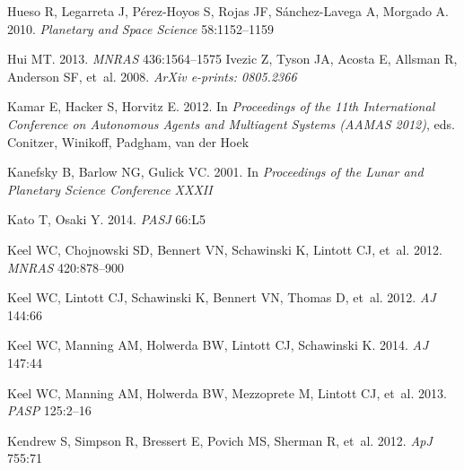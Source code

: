 \documentclass{ar2e}
\def\apj{ApJ}
\def\mnras{MNRAS}
\def\aj{AJ}
\def\pasp{PASP}
\def\pasj{PASJ}
\begin{document}
\begin{thebibliography}{}
{Hueso} R, {Legarreta} J, {P{\'e}rez-Hoyos} S, {Rojas} JF, {S{\'a}nchez-Lavega}
  A, {Morgado} A. 2010.
\newblock \textit{Planetary and Space Science} 58:1152--1159

{Hui} MT. 2013.
\newblock \textit{\mnras} 436:1564--1575
%
{Ivezic} Z, {Tyson} JA, {Acosta} E, {Allsman} R, {Anderson} SF, et~al. 2008.
\newblock \textit{ArXiv e-prints: 0805.2366}

{Kamar} E, {Hacker} S, {Horvitz} E. 2012.
\newblock In \textit{Proceedings of the 11th International Conference on
  Autonomous Agents and Multiagent Systems (AAMAS 2012)}, eds. {Conitzer},
  {Winikoff}, {Padgham}, {van der Hoek}

{Kanefsky} B, {Barlow} NG, {Gulick} VC. 2001.
\newblock In \textit{Proceedings of the Lunar and Planetary Science Conference
  XXXII}

{Kato} T, {Osaki} Y. 2014.
\newblock \textit{\pasj} 66:L5

{Keel} WC, {Chojnowski} SD, {Bennert} VN, {Schawinski} K, {Lintott} CJ, et~al.
  2012{}.
\newblock \textit{\mnras} 420:878--900

{Keel} WC, {Lintott} CJ, {Schawinski} K, {Bennert} VN, {Thomas} D, et~al.
  2012{}.
\newblock \textit{\aj} 144:66

{Keel} WC, {Manning} AM, {Holwerda} BW, {Lintott} CJ, {Schawinski} K. 2014.
\newblock \textit{\aj} 147:44

{Keel} WC, {Manning} AM, {Holwerda} BW, {Mezzoprete} M, {Lintott} CJ, et~al.
  2013.
\newblock \textit{\pasp} 125:2--16

{Kendrew} S, {Simpson} R, {Bressert} E, {Povich} MS, {Sherman} R, et~al. 2012.
\newblock \textit{\apj} 755:71


\end{thebibliography}
\end{document}

